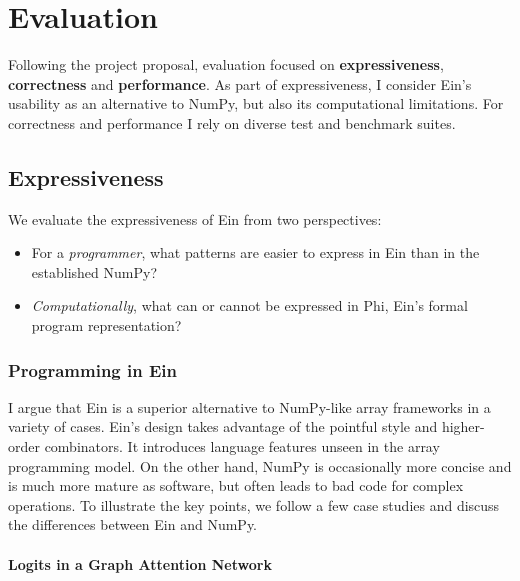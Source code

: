 \chapter{Evaluation}

Following the project proposal, evaluation focused on \textbf{expressiveness}, \textbf{correctness} and \textbf{performance}.
As part of expressiveness, I consider Ein's usability as an alternative to NumPy, but also its computational limitations. For correctness and performance I rely on diverse test and benchmark suites.

\section{Expressiveness}

We evaluate the expressiveness of Ein from two perspectives: \begin{itemize}
    \item For a \textit{programmer}, what patterns are easier to express in Ein than in the established NumPy?
    \item \textit{Computationally}, what can or cannot be expressed in Phi, Ein's formal program representation?
\end{itemize}

\subsection{Programming in Ein}

I argue that Ein is a superior alternative to NumPy-like array frameworks in a variety of cases. 
Ein's design takes advantage of the pointful style and higher-order combinators. 
It introduces language features unseen in the array programming model.
On the other hand, NumPy is occasionally more concise and is much more mature as software, but often leads to bad code for complex operations.
To illustrate the key points, we follow a few case studies and discuss the differences between Ein and NumPy.

\subsubsection{Logits in a Graph Attention Network}

